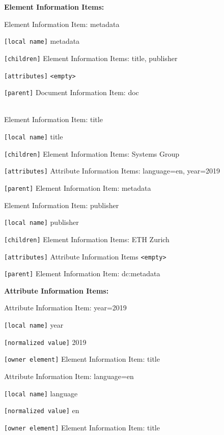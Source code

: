 \documentclass[11pt,oneside,a4paper]{article}
\begin{document}
\textbf{Element Information Items:}
\vspace{-\topsep}
\begin{multicols}{2}
	\begin{compactitem}
		\item Element Information Item: metadata
		\item \verb|[local name]| metadata
		\item \verb|[children]| Element Information Items: title, publisher
		\item \verb|[attributes]| \verb|<empty>|
		\item \verb|[parent]| Document Information Item: doc\\\\
	\end{compactitem}
	
	\begin{compactitem}
		\item Element Information Item: title
		\item \verb|[local name]| title
		\item \verb|[children]| Element Information Items: Systems Group
		\item \verb|[attributes]| Attribute Information Items: language=en, year=2019
		\item \verb|[parent]| Element Information Item: metadata\\
	\end{compactitem}
\end{multicols}

	\begin{compactitem}
	\item Element Information Item: publisher
	\item \verb|[local name]| publisher
	\item \verb|[children]| Element Information Items: ETH Zurich
	\item \verb|[attributes]| Attribute Information Items \verb|<empty>|
	\item \verb|[parent]| Element Information Item: dc:metadata
\end{compactitem}

\textbf{Attribute Information Items:}
\vspace{-\topsep}
\begin{multicols}{2}
	\begin{compactitem}
		\item Attribute Information Item: year=2019
		\item \verb|[local name]| year
		\item \verb|[normalized value]| 2019
		\item \verb|[owner element]| Element Information Item: title
		
		\item Attribute Information Item: language=en
		\item \verb|[local name]| language
		\item \verb|[normalized value]| en
		\item \verb|[owner element]| Element Information Item: title
	\end{compactitem}
\end{multicols}
\vspace{-\topsep}
\end{document}
